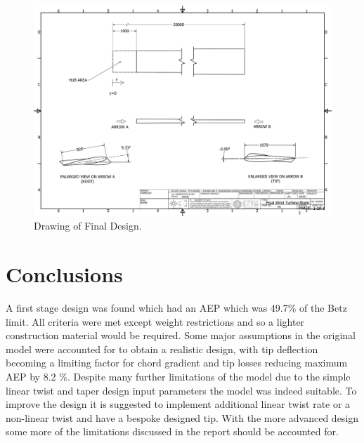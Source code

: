 \documentclass[11pt]{article}
\begin{document}
\begin{figure}[p]  %
	\centering
	\includegraphics[width=1.2\textwidth, angle=270]{WTBlade}
	\caption{Drawing of Final Design.}
	\label{fig:CAD}
\end{figure} 

\FloatBarrier
\section{Conclusions}

A first stage design was found which had an AEP which was 49.7\% of the Betz limit. All criteria were met except weight restrictions and so a lighter construction material would be required. Some major assumptions in the original model were accounted for to obtain a realistic design, with tip deflection becoming a limiting factor for chord gradient and tip losses reducing maximum AEP by 8.2 \%. Despite many further limitations of the model due to the simple linear twist and taper design input parameters the model was indeed suitable. To improve the design it is suggested to implement additional linear twist rate or a non-linear twist and have a bespoke designed tip. With the more advanced design some more of the limitations discussed in the report should be accounted for.
\end{document}
